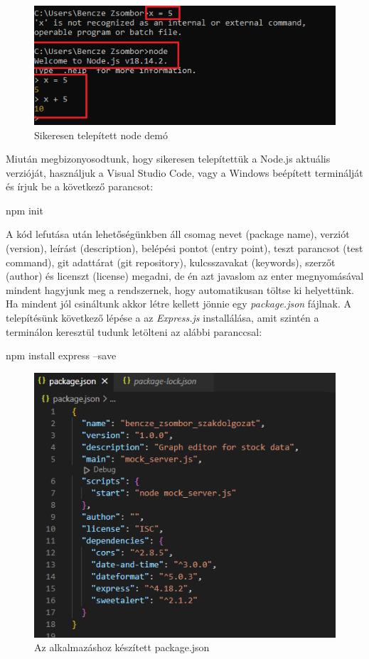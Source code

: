 \begin{figure}[h]
\centering
\includegraphics[scale=0.9]{images/nodeTest.png}
\caption{Sikeresen telepített node demó}
\label{fig:node}
\end{figure}

Miután megbizonyosodtunk, hogy sikeresen telepítettük a Node.js aktuális verzióját, használjuk a Visual Studio Code, vagy a Windows beépített terminálját és írjuk be a következő parancsot:
\begin{cpp}
npm init
\end{cpp} 
A kód lefutása után lehetőségünkben áll csomag nevet (package name), verziót (version), leírást (description), belépési pontot (entry point), teszt parancsot (test command), git adattárat (git repository), kulcsszavakat (keywords), szerzőt (author) és licenszt (license) megadni, de én azt javaslom az enter megnyomásával mindent hagyjunk meg a rendszernek, hogy automatikusan töltse ki helyettünk. Ha mindent jól csináltunk akkor létre kellett jönnie egy \emph{package.json} fájlnak.  A telepítésünk következő lépése a az \emph{Express.js} installálása, amit szintén a terminálon keresztül tudunk letölteni az alábbi paranccsal:
\begin{cpp}
npm install express --save
\end{cpp}

\begin{figure}[h]
\centering
\includegraphics[scale=0.9]{images/packageJSON.png}
\caption{Az alkalmazáshoz készített package.json }
\label{fig:package}
\end{figure}

